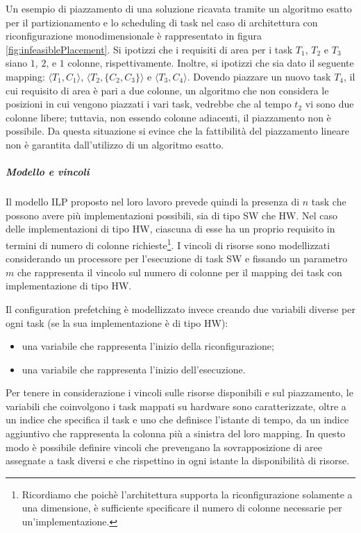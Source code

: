 Un esempio di piazzamento di una soluzione ricavata tramite un algoritmo esatto 
per il partizionamento e lo scheduling di task nel caso di 
architettura con riconfigurazione monodimensionale è rappresentato in 
figura \ref{fig:infeasiblePlacement}. Si ipotizzi che i requisiti di area per i 
task $T_1$, $T_2$ e $T_3$ siano $1$, $2$, e $1$ colonne, rispettivamente. Inoltre, si
ipotizzi che sia dato il seguente mapping: $\langle T_1, C_1 \rangle$, $\langle
T_2, \{C_2, C_3\} \rangle$ e $\langle T_3, C_4 \rangle$. Dovendo piazzare un nuovo task 
$T_4$, il cui requisito di area è pari a due colonne, un algoritmo che non 
considera le posizioni in cui vengono piazzati i vari task, vedrebbe che al 
tempo $t_2$ vi sono due colonne libere; tuttavia, non essendo colonne 
adiacenti, il piazzamento non è possibile. Da questa situazione si evince che 
la fattibilità del piazzamento lineare non è garantita dall'utilizzo di un 
algoritmo esatto.

\subparagraph{Modello e vincoli}
Il modello \ac{ILP} proposto nel loro lavoro prevede quindi la presenza di $n$ 
task che possono avere più implementazioni possibili, sia di tipo SW che HW. 
Nel caso delle implementazioni di tipo HW, ciascuna di esse ha un proprio 
requisito in termini di numero di colonne richieste\footnote{Ricordiamo che 
poichè l'architettura supporta la riconfigurazione solamente a una dimensione, 
è sufficiente specificare il numero di colonne necessarie per 
un'implementazione.}. I vincoli di risorse sono modellizzati considerando un 
processore per l'esecuzione di task SW e fissando un parametro $m$ che 
rappresenta il vincolo sul numero di colonne per il mapping dei task con 
implementazione di tipo HW.

Il configuration prefetching è modellizzato invece creando due variabili 
diverse per ogni task (se la sua implementazione è di tipo HW):
\begin{itemize}
 \item una variabile che rappresenta l'inizio della riconfigurazione;
 \item una variabile che rappresenta l'inizio dell'esecuzione.
\end{itemize}
Per tenere in considerazione i vincoli sulle risorse disponibili e sul 
piazzamento, le variabili che coinvolgono i task mappati su hardware sono 
caratterizzate, oltre a un indice che specifica il task e uno che definisce 
l'istante di tempo, da un indice aggiuntivo che rappresenta la colonna più a 
sinistra del loro mapping. In questo modo è possibile definire vincoli che 
prevengano la sovrapposizione di aree assegnate a task diversi e che rispettino 
in ogni istante la disponibilità di risorse.

